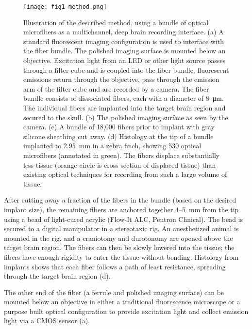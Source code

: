 \begin{figure}
\texttt{[image: fig1-method.png]}
\caption[Diagram of optics and fiber interface]{Illustration of the described method, using a bundle of optical microfibers as a multichannel, deep brain recording interface. (a) A standard fluorescent imaging configuration is used to interface with the fiber bundle. The polished imaging surface is mounted below an objective. Excitation light from an LED or other light source passes through a filter cube and is coupled into the fiber bundle; fluorescent emissions return through the objective, pass through the emission arm of the filter cube and are recorded by a camera. The fiber bundle consists of dissociated fibers, each with a diameter of 8~\si{\micro\meter}. The individual fibers are implanted into the target brain region and secured to the skull. (b) The polished imaging surface as seen by the camera. (c) A bundle of 18,000 fibers prior to implant with gray silicone sheathing cut away. (d) Histology at the tip of a bundle implanted to 2.95~mm in a zebra finch, showing 530 optical microfibers (annotated in green). The fibers displace substantially less tissue (orange circle is cross section of displaced tissue) than existing optical techniques for recording from such a large volume of tissue.}
\label{fig:method}
\end{figure}

After cutting away a fraction of the fibers in the bundle (based on the desired implant size), the remaining fibers are anchored together 4--5~mm from the tip using a bead of light-cured acrylic (Flow-It ALC, Pentron Clinical). The bead is secured to a digital manipulator in a stereotaxic rig. An anesthetized animal is mounted in the rig, and a craniotomy and durotonomy are opened above the target brain region. The fibers can then be slowly lowered into the tissue; the fibers have enough rigidity to enter the tissue without bending. Histology from implants shows that each fiber follows a path of least resistance, spreading through the target brain region (d).

The other end of the fiber (a ferrule and polished imaging surface) can be mounted below an objective in either a traditional fluorescence microscope or a purpose built optical configuration to provide excitation light and collect emission light via a CMOS sensor (a).

